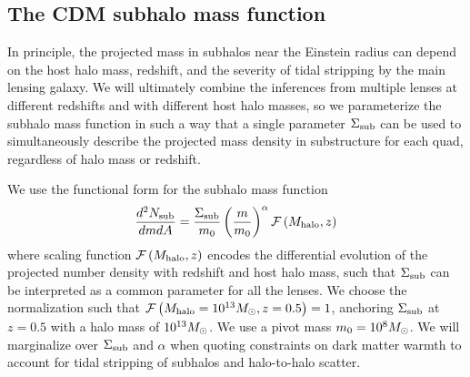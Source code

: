 \subsection{The CDM subhalo mass function}
\label{ssec:submfunc}
In principle, the projected mass in subhalos near the Einstein radius can depend on the host halo mass, redshift, and the severity of tidal stripping by the main lensing galaxy. We will ultimately combine the inferences from multiple lenses at different redshifts and with different host halo masses, so we parameterize the subhalo mass function in such a way that a single parameter $\Sigma_{\rm{sub}}$ can be used to simultaneously describe the projected mass density in substructure for each quad, regardless of halo mass or redshift. 

We use the functional form for the subhalo mass function
\begin{equation}
\label{eqn:subhalomfunc}
\frac{d^2 N_{\rm{sub}}}{dm dA} =  \frac{\Sigma_{\rm{sub}}}{m_0} \left(\frac{m}{m_0}\right)^{\alpha} {\mathcal{F}} \left(M_{\rm{halo}}, z\right)
\end{equation}
where scaling function ${\mathcal{F}} \left(M_{\rm{halo}}, z\right)$ encodes the differential evolution of the projected number density with redshift and host halo mass, such that $\Sigma_{\rm{sub}}$ can be interpreted as a common parameter for all the lenses. We choose the normalization such that $\mathcal{F} \left(M_{\rm{halo}} = 10^{13} {M_{\odot}}, z = 0.5\right) = 1$, anchoring $\Sigma_{\rm{sub}}$ at $z=0.5$ with a halo mass of $10^{13}{M_{\odot}}$. We use a pivot mass $m_0 = 10^8 {M_{\odot}}$. We will marginalize over $\Sigma_{\rm{sub}}$ and $\alpha$ when quoting constraints on dark matter warmth to account for tidal stripping of subhalos and halo-to-halo scatter.  

